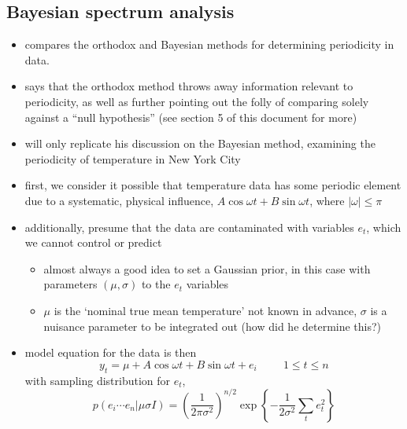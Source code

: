 \documentclass[../jaynes_prob_theory_notes.tex]{subfiles}
\begin{document}
        \subsection{Bayesian spectrum analysis}
            \begin{itemize} 
                \item compares the orthodox and Bayesian methods for determining periodicity in data.
                \item says that the orthodox method throws away information relevant to periodicity, as well as further pointing out the folly of comparing solely against a ``null hypothesis'' (see section 5 of this document for more)
                \item will only replicate his discussion on the Bayesian method, examining the periodicity of temperature in New York City
                \item first, we consider it possible that temperature data has some periodic element due to a systematic, physical influence, \(A \cos \omega t + B \sin \omega t\), where \(|\omega| \leq \pi\)
                \item additionally, presume that the data are contaminated with variables \(e_t\), which we cannot control or predict
                    \begin{itemize} 
                        \item almost always a good idea to set a Gaussian prior, in this case with parameters \((\mu, \sigma)\) to the \(e_t\) variables
                        \item \(\mu\) is the `nominal true mean temperature' not known in advance, \(\sigma\) is a nuisance parameter to be integrated out (how did he determine this?)
                    \end{itemize} 
                \item model equation for the data is then 
                    \begin{equation*} 
                        y_t = \mu + A \cos \omega t + B \sin \omega t + e_i \hspace{1cm} 1 \leq t \leq n
                    \end{equation*}
                    with sampling distribution for \(e_t\),
                    \begin{equation*} 
                        p(e_i \cdots e_n | \mu \sigma I) = {\left( \frac{1}{2\pi\sigma^2} \right)}^{n/2} \exp \left \{ -\frac{1}{2\sigma^2} \sum\limits_t e^2_t \right \}
                    \end{equation*}

\end{itemize}
\end{document}
